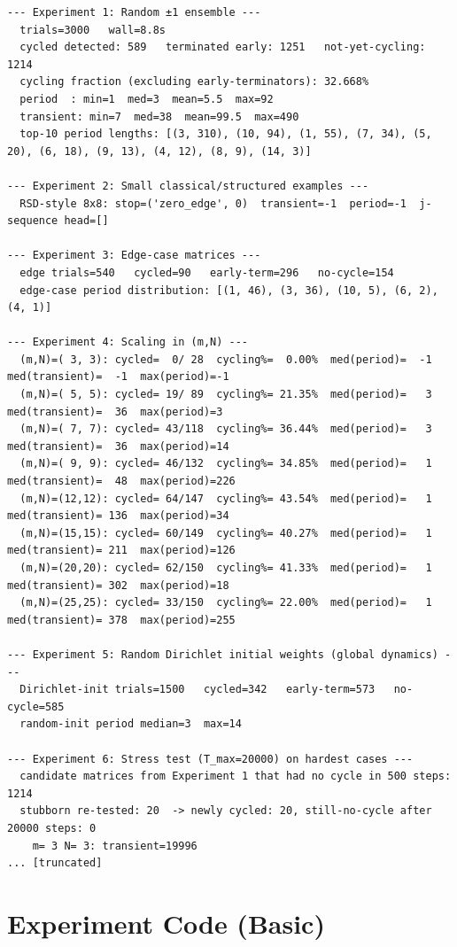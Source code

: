 \documentclass[11pt]{article}
\begin{document}
\begin{lstlisting}
--- Experiment 1: Random ±1 ensemble ---
  trials=3000   wall=8.8s
  cycled detected: 589   terminated early: 1251   not-yet-cycling: 1214
  cycling fraction (excluding early-terminators): 32.668%
  period  : min=1  med=3  mean=5.5  max=92
  transient: min=7  med=38  mean=99.5  max=490
  top-10 period lengths: [(3, 310), (10, 94), (1, 55), (7, 34), (5, 20), (6, 18), (9, 13), (4, 12), (8, 9), (14, 3)]

--- Experiment 2: Small classical/structured examples ---
  RSD-style 8x8: stop=('zero_edge', 0)  transient=-1  period=-1  j-sequence head=[]

--- Experiment 3: Edge-case matrices ---
  edge trials=540   cycled=90   early-term=296   no-cycle=154
  edge-case period distribution: [(1, 46), (3, 36), (10, 5), (6, 2), (4, 1)]

--- Experiment 4: Scaling in (m,N) ---
  (m,N)=( 3, 3): cycled=  0/ 28  cycling%=  0.00%  med(period)=  -1  med(transient)=  -1  max(period)=-1
  (m,N)=( 5, 5): cycled= 19/ 89  cycling%= 21.35%  med(period)=   3  med(transient)=  36  max(period)=3
  (m,N)=( 7, 7): cycled= 43/118  cycling%= 36.44%  med(period)=   3  med(transient)=  36  max(period)=14
  (m,N)=( 9, 9): cycled= 46/132  cycling%= 34.85%  med(period)=   1  med(transient)=  48  max(period)=226
  (m,N)=(12,12): cycled= 64/147  cycling%= 43.54%  med(period)=   1  med(transient)= 136  max(period)=34
  (m,N)=(15,15): cycled= 60/149  cycling%= 40.27%  med(period)=   1  med(transient)= 211  max(period)=126
  (m,N)=(20,20): cycled= 62/150  cycling%= 41.33%  med(period)=   1  med(transient)= 302  max(period)=18
  (m,N)=(25,25): cycled= 33/150  cycling%= 22.00%  med(period)=   1  med(transient)= 378  max(period)=255

--- Experiment 5: Random Dirichlet initial weights (global dynamics) ---
  Dirichlet-init trials=1500   cycled=342   early-term=573   no-cycle=585
  random-init period median=3  max=14

--- Experiment 6: Stress test (T_max=20000) on hardest cases ---
  candidate matrices from Experiment 1 that had no cycle in 500 steps: 1214
  stubborn re-tested: 20  -> newly cycled: 20, still-no-cycle after 20000 steps: 0
    m= 3 N= 3: transient=19996
... [truncated]
\end{lstlisting}


\section{Experiment Code (Basic)}
\end{document}
